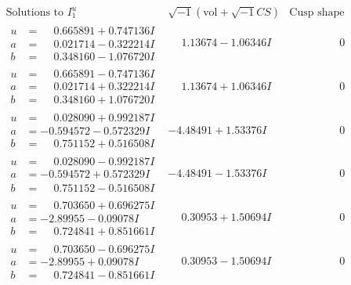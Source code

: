 \documentclass[1p]{elsarticle_modified}
\theoremstyle{definition}
\newcommand{\I}{\sqrt{-1}}
\begin{document}
$$\begin{array}{c|c|c}  
\text{Solutions to }I^u_{1}& \I (\text{vol} + \sqrt{-1}CS) & \text{Cusp shape}\\
 \hline 
\begin{aligned}
u &= \phantom{-}0.665891 + 0.747136 I \\
a &= \phantom{-}0.021714 - 0.322214 I \\
b &= \phantom{-}0.348160 - 1.076720 I\end{aligned}
 & \phantom{-}1.13674 - 1.06346 I & \phantom{-0.000000 } 0 \\ \hline\begin{aligned}
u &= \phantom{-}0.665891 - 0.747136 I \\
a &= \phantom{-}0.021714 + 0.322214 I \\
b &= \phantom{-}0.348160 + 1.076720 I\end{aligned}
 & \phantom{-}1.13674 + 1.06346 I & \phantom{-0.000000 } 0 \\ \hline\begin{aligned}
u &= \phantom{-}0.028090 + 0.992187 I \\
a &= -0.594572 - 0.572329 I \\
b &= \phantom{-}0.751152 + 0.516508 I\end{aligned}
 & -4.48491 + 1.53376 I & \phantom{-0.000000 } 0 \\ \hline\begin{aligned}
u &= \phantom{-}0.028090 - 0.992187 I \\
a &= -0.594572 + 0.572329 I \\
b &= \phantom{-}0.751152 - 0.516508 I\end{aligned}
 & -4.48491 - 1.53376 I & \phantom{-0.000000 } 0 \\ \hline\begin{aligned}
u &= \phantom{-}0.703650 + 0.696275 I \\
a &= -2.89955 - 0.09078 I \\
b &= \phantom{-}0.724841 + 0.851661 I\end{aligned}
 & \phantom{-}0.30953 + 1.50694 I & \phantom{-0.000000 } 0 \\ \hline\begin{aligned}
u &= \phantom{-}0.703650 - 0.696275 I \\
a &= -2.89955 + 0.09078 I \\
b &= \phantom{-}0.724841 - 0.851661 I\end{aligned}
 & \phantom{-}0.30953 - 1.50694 I & \phantom{-0.000000 } 0 \\ \hline\begin{aligned}

\end{aligned}
\end{array}$$
\end{document}
